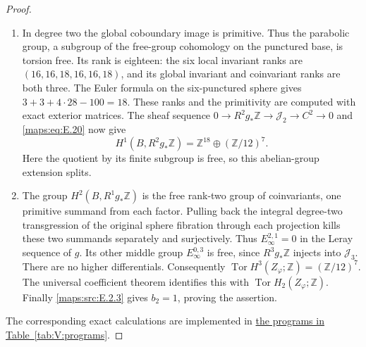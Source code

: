 \documentclass[11pt,a4paper]{article}
\numberwithin{equation}{section}
\theoremstyle{definition}
\begin{document}
\begin{proof}
\begin{enumerate}[label=\arabic*.,leftmargin=*]
\item In degree two the global coboundary image is primitive.
Thus the parabolic group, a subgroup of the free-group
cohomology on the punctured base, is torsion free. Its rank
is eighteen: the six local invariant ranks are
\((16,16,18,16,16,18)\), and its global invariant and
coinvariant ranks are both three. The Euler formula on the
six-punctured sphere gives \(3+3+4\cdot28-100=18\).
These ranks and the primitivity are computed with exact exterior matrices. The sheaf sequence
\(0\to R^2g_*\mathbb Z\to\mathcal J_2\to C^2\to0\)
and \eqref{maps:eq:E.20} now give
\[
 H^1(B,R^2g_*\mathbb Z)
     =\mathbb Z^{18}\oplus(\mathbb Z/12)^7.
\]
Here the quotient by its finite subgroup is free, so this
abelian-group extension splits.

\item The group \(H^2(B,R^1g_*\mathbb Z)\) is the free
rank-two group of coinvariants, one primitive summand from
each factor. Pulling back the integral degree-two
transgression of the original sphere fibration through each
projection kills these two summands separately and
surjectively. Thus \(E_\infty^{2,1}=0\) in the Leray
sequence of \(g\). Its other middle group
\(E_\infty^{0,3}\) is free, since \(R^3g_*\mathbb Z\)
injects into \(\mathcal J_3\). There are no higher
differentials. Consequently
\(\operatorname{Tor}H^3(Z_\varphi;\mathbb Z)
=(\mathbb Z/12)^7\). The universal coefficient theorem
identifies this with \(\operatorname{Tor}H_2(Z_\varphi;\mathbb Z)\).
Finally \ref{maps:src:E.2.3} gives \(b_2=1\), proving the assertion.
\end{enumerate}
The corresponding exact calculations are implemented in \hyperlink{prog:V:shifted-homology}{the programs in Table~\ref*{tab:V:programs}}.
\end{proof}
\end{document}
